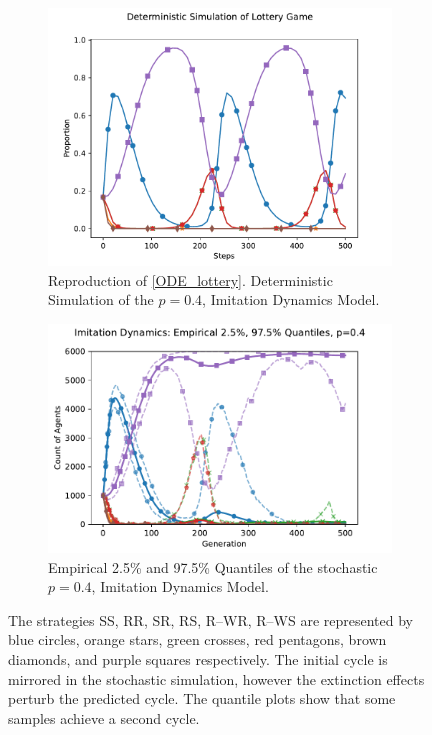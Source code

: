  \FloatBarrier 
\begin{figure}[!h]
  \begin{subfigure}[b]{0.45\textwidth}
    \includegraphics[width=\textwidth]{images/ODE_lottery.pdf}
    \caption{Reproduction of \ref{ODE_lottery}. Deterministic Simulation of the $p=0.4$, Imitation Dynamics Model. }
    \label{lotteryODE}
  \end{subfigure}
  \hfill
  \begin{subfigure}[b]{0.45\textwidth}
    \includegraphics[width=1.1\textwidth]{images/lotteryp4_me_quantiles_empirical.pdf}
    \caption{Empirical 2.5\% and 97.5\% Quantiles of the stochastic $p=0.4$, Imitation Dynamics Model. }
    \label{lotteryp4_me_emp}
  \end{subfigure}
  \caption{The strategies SS, RR, SR, RS, R--WR, R--WS are represented by blue circles, orange stars, green crosses, red pentagons, brown diamonds, and purple squares respectively. The initial cycle is mirrored in the stochastic simulation, however the extinction effects perturb the predicted cycle. The quantile plots show that some samples achieve a second cycle.} \label{lottery_ODE_emp}
\end{figure} 
